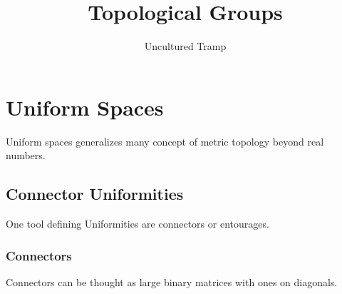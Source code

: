 \documentclass[12pt]{scrartcl}
\author{Uncultured Tramp}
\title{Topological Groups}
\renewcommand{\.}{\; . \;}
\begin{document}
\maketitle
\newpage
\tableofcontents
\newpage
\section{Uniform Spaces}
Uniform spaces generalizes many concept of metric topology beyond real numbers.
\subsection{Connector Uniformities}
One tool defining Uniformities are connectors or entourages.
\subsubsection{Connectors}
Connectors can be thought as large binary matrices with ones on diagonals.
\end{document}
